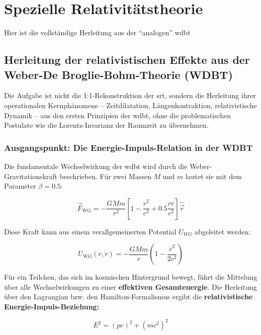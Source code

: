 \chapter{Spezielle Relativitätstheorie}
Hier ist die vollständige Herleitung aus der \enquote{analogen} \gls{wdbt}

\section{Herleitung der relativistischen Effekte aus der Weber-De Broglie-Bohm-Theorie (WDBT)}
Die Aufgabe ist nicht die 1:1-Rekonstruktion der \gls{srt}, sondern die Herleitung ihrer operationalen Kernphänomene – Zeitdilatation, Längenkontraktion, relativistische Dynamik – aus den ersten
Prinzipien der \gls{wdbt}, ohne die problematischen Postulate wie die Lorentz-Invarianz der Raumzeit zu übernehmen.

\subsection{Ausgangspunkt: Die Energie-Impuls-Relation in der WDBT}
Die fundamentale Wechselwirkung der \gls{wdbt} wird durch die Weber-Gravitationskraft beschrieben. Für zwei Massen $M$ und $m$ lautet sie mit dem Parameter $\beta = 0.5$:

\begin{equation}
    \label{eq:weber_g}
    \vec{F}_{\text{WG}} = -\frac{G M m}{r^2} \left[ 1 - \frac{\dot{r}^2}{c^2} + 0.5 \frac{r \ddot{r}}{c^2} \right] \hat{\vec{r}}
\end{equation}

Diese Kraft kann aus einem verallgemeinerten Potential $U_{WG}$ abgeleitet werden:

\begin{equation}
    \label{eq:potential}
    U_{\text{WG}}(r, \dot{r}) = -\frac{G M m}{r} \left( 1 - \frac{\dot{r}^2}{2c^2} \right)
\end{equation}

Für ein Teilchen, das sich im kosmischen Hintergrund bewegt, führt die Mittelung über alle Wechselwirkungen zu einer \textbf{effektiven Gesamtenergie}. Die Herleitung über den Lagrangian bzw. den
Hamilton-Formalismus ergibt die \textbf{relativistische Energie-Impuls-Beziehung:}

\begin{equation}
    \label{eq:energie_impuls_beziehung}
    \boxed
    {
        E^2 = (p c)^2 + (m c^2)^2
    }
\end{equation}

